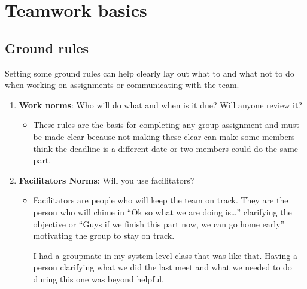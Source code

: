 \documentclass[
10pt, %
letterpaper, %
oneside, %
headinclude,footinclude, %
BCOR5mm, %
]{scrartcl}
\begin{document}
\section{Teamwork basics}

\subsection{Ground rules}

Setting some ground rules can help clearly lay out what to and what not
to do when working on assignments or communicating with the team.

\begin{enumerate}
\item
  \textbf{Work norms}: Who will do what and when is it due? Will anyone
  review it?
\begin{itemize}
\item
  These rules are the basis for completing any group assignment and must
  be made clear because not making these clear can make some members
  think the deadline is a different date or two members could do the
  same part.
\end{itemize}
\item
  \textbf{Facilitators Norms}: Will you use facilitators?
\begin{itemize}
\item
  Facilitators are people who will keep the team on track. They are the
  person who will chime in ``Ok so what we are doing is\ldots{}''
  clarifying the objective or ``Guys if we finish this part now, we can
  go home early'' motivating the group to stay on track.

  I had a groupmate in my system-level class that was like that. Having
  a person clarifying what we did the last meet and what we needed to do
  during this one was beyond helpful.


\end{itemize}
\end{enumerate}
\end{document}

